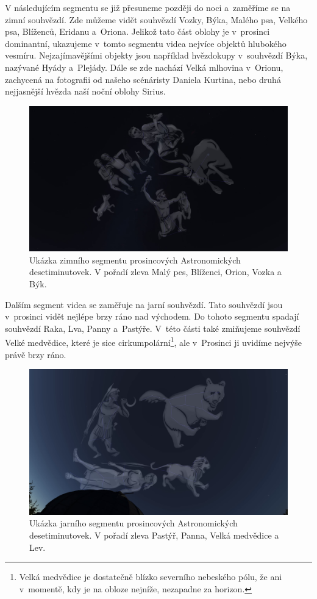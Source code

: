 \documentclass[12pt,a4paper,titlepage]{article}
\begin{document}
V následujícím segmentu se již přesuneme později do noci a~zaměříme se na zimní souhvězdí. Zde můžeme vidět souhvězdí Vozky, Býka, Malého psa, Velkého psa, Blíženců, Eridanu a~Oriona. Jelikož tato část oblohy je v~prosinci dominantní, ukazujeme v~tomto segmentu videa nejvíce objektů hlubokého vesmíru. Nejzajímavějšími objekty jsou například hvězdokupy v~souhvězdí Býka, nazývané Hyády a~Plejády. Dále se zde nachází Velká mlhovina v~Orionu, zachycená na fotografii od našeho scénáristy Daniela Kurtina, nebo druhá nejjasnější hvězda naší noční oblohy Sirius.

\begin{figure}[H]
	\centering
	\includegraphics[width=.95\textwidth]{ac12_zima.png}
	\caption{Ukázka zimního segmentu prosincových Astronomických desetiminutovek. V pořadí zleva Malý pes, Blíženci, Orion, Vozka a Býk.}\label{prac:ac12_zima}
\end{figure}

Dalším segment videa se zaměřuje na jarní souhvězdí. Tato souhvězdí jsou v~prosinci vidět nejlépe brzy ráno nad východem. Do tohoto segmentu spadají souhvězdí Raka, Lva, Panny a~Pastýře. V~této části také zmiňujeme souhvězdí Velké medvědice, které je sice cirkumpolární\footnote{Velká medvědice je dostatečně blízko severního nebeského pólu, že ani v~momentě, kdy je na obloze nejníže, nezapadne za horizon.}, ale v~Prosinci ji uvidíme nejvýše právě brzy ráno.

\begin{figure}[H]
	\centering
	\includegraphics[width=.95\textwidth]{ac12_jaro.png}
	\caption{Ukázka jarního segmentu prosincových Astronomických desetiminutovek. V pořadí zleva Pastýř, Panna, Velká medvědice a Lev.}\label{prac:ac12_jaro}
\end{figure}
\end{document}
